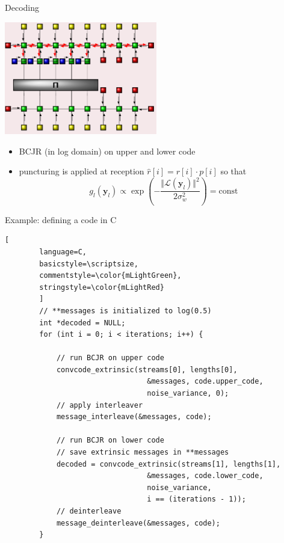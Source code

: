\documentclass[xcolor={usenames,dvipsnames},11pt]{beamer}
\begin{document}
\begin{frame}[c]{Decoding}
    \begin{center}
        \includegraphics[width=0.5\textwidth]{./images/decoding.png}
    \end{center}
    \begin{itemize}
        \item BCJR (in log domain) on upper and lower code
        \item puncturing is applied at reception 
            $\hat{r}[i] = r[i]\cdot p[i]$ so that
            \[
                g_l(\mathbf{y}_l) \propto \exp\left( -\frac{\Vert \mathcal{L}(\mathbf{y}_l)\Vert^2}{2\sigma_w^2} \right) = \text{const}
            \]
    \end{itemize}
    
\end{frame}
\begin{frame}[c,fragile]{Example: defining a code in C}
    \begin{lstlisting}[
        language=C,
        basicstyle=\scriptsize,
        commentstyle=\color{mLightGreen},
        stringstyle=\color{mLightRed}
        ]
        // **messages is initialized to log(0.5)
        int *decoded = NULL;
        for (int i = 0; i < iterations; i++) {

            // run BCJR on upper code
            convcode_extrinsic(streams[0], lengths[0], 
                                 &messages, code.upper_code,
                                 noise_variance, 0);
            // apply interleaver
            message_interleave(&messages, code);

            // run BCJR on lower code
            // save extrinsic messages in **messages
            decoded = convcode_extrinsic(streams[1], lengths[1], 
                                 &messages, code.lower_code, 
                                 noise_variance, 
                                 i == (iterations - 1));
            // deinterleave
            message_deinterleave(&messages, code);
        }
    \end{lstlisting}
\end{frame}
\end{document}
